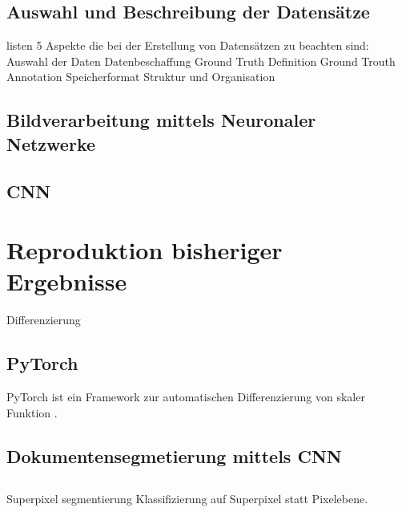 \section{Auswahl und Beschreibung der Datensätze}
\textcite[985\psqq]{doermann_datasets_2014} listen 5 Aspekte die bei der Erstellung von Datensätzen zu beachten sind:
Auswahl der Daten
Datenbeschaffung
Ground Truth Definition
Ground Trouth Annotation
Speicherformat
Struktur und Organisation

\section{Bildverarbeitung mittels Neuronaler Netzwerke}

\section{CNN}

\chapter{Reproduktion bisheriger Ergebnisse}
\label{chap:reproduktion}


Differenzierung

\section{PyTorch}
PyTorch ist ein Framework zur automatischen Differenzierung von skaler Funktion \autocite{paszke_automatic_2017}.

\section{Dokumentensegmetierung mittels CNN}


\section{\textcite{chen_page_2016}}
Superpixel segmentierung
Klassifizierung auf Superpixel statt Pixelebene.

\section{\textcite{wick_fully_2017}}

\section{\textcite{alberti_historical_2017}}


